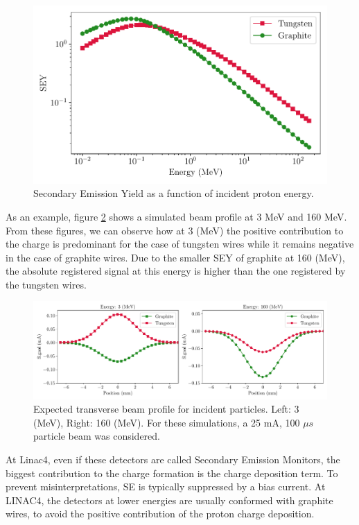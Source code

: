 \begin{figure}[h]
    \centering
    \includegraphics[width=0.85\columnwidth]{Figure_SEY/SEY_compa.pdf}
    \caption{Secondary Emission Yield as a function of incident proton energy. }
    \label{fig:SEYmat}
\end{figure}

As an example, figure \ref{fig:ProfComparison} shows a simulated beam profile at 3 MeV and 160 MeV. From these figures, we can observe how at 3 (MeV) the positive contribution to the charge is predominant for the case of tungsten wires while it remains negative in the case of graphite wires. Due to the smaller SEY of graphite at 160 (MeV), the absolute registered signal at this energy is higher than the one registered by the tungsten wires. 

\begin{figure}[h]
    \centering
    \includegraphics[width=0.85\columnwidth]{Figure_ProfCompa/ProfileComparison.pdf}
    \caption{Expected transverse beam profile for incident \hm particles. Left: 3 (MeV), Right: 160 (MeV). For these simulations, a 25 mA, 100 $\mu s$ particle beam was considered. }
    \label{fig:ProfComparison}
\end{figure}

At Linac4, even if these detectors are called Secondary Emission Monitors, the biggest contribution to the charge formation is the charge deposition term. To prevent misinterpretations, SE is typically suppressed by a bias current.  At LINAC4, the detectors at lower energies are usually conformed with graphite wires, to avoid the positive contribution of the proton charge deposition. 

